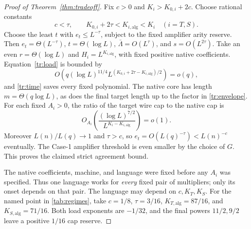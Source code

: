\documentclass[11pt,letterpaper]{article}
\theoremstyle{definition}
\theoremstyle{remark}
\begin{document}
\begin{proof}[Proof of Theorem~\ref{thm:tradeoff}]
Fix $c>0$ and $K_i>K_{0,i}+2c$. Choose rational constants
\[
 c<\tau,\qquad K_{0,i}+2\tau<K_{i,\mathrm{alg}}<K_i
 \quad(i=T,S).
\]
Choose the least $t$ with $e_t\le L^{-\tau}$, subject to the fixed
amplifier arity reserve. Then
$e_t=\Theta(L^{-\tau})$, $t=\Theta(\log L)$,
$\bar\Lambda=O(L^\tau)$, and $s=O(L^{2\tau})$.
Take an even $r=\Theta(\log L)$ and
$H_i=L^{K_{i,\mathrm{alg}}}$, with fixed positive native coefficients.
Equation~\eqref{tr:load} is bounded by
\[
 O\left(q(\log L)^{11/4}
 L^{(K_{0,i}+2\tau-K_{i,\mathrm{alg}})/2}\right)=o(q),
\]
and \eqref{tr:time} saves every fixed polynomial.
The native core has length $m=\Theta(q\log L)$, as does the final
target length up to the factor in \eqref{tr:envelope}.
For each fixed $A_i>0$, the ratio of the target wire cap to the
native cap is
\[
 O_{A_i}\left(
 \frac{(\log L)^{7/2}}{L^{K_i-K_{i,\mathrm{alg}}}}\right)=o(1).
\]
Moreover $L(n)/L(q)\to1$ and $\tau>c$, so
$e_t=O(L(q)^{-\tau})<L(n)^{-c}$ eventually. The Case-1 amplifier
threshold is even smaller by the choice of $G$.
This proves the claimed strict agreement bound.

The native coefficients, machine, and language were fixed before any
$A_i$ was specified. Thus one language works for \emph{every} fixed
pair of multipliers; only its onset depends on that pair.
The language may depend on $c,K_T,K_S$.
For the named point in \cref{tab:regimes}, take
$c=1/8$, $\tau=3/16$,
$K_{T,\mathrm{alg}}=87/16$, and $K_{S,\mathrm{alg}}=71/16$.
Both load exponents are $-1/32$, and the final powers $11/2,9/2$
leave a positive $1/16$ cap reserve.
\end{proof}
\end{document}
